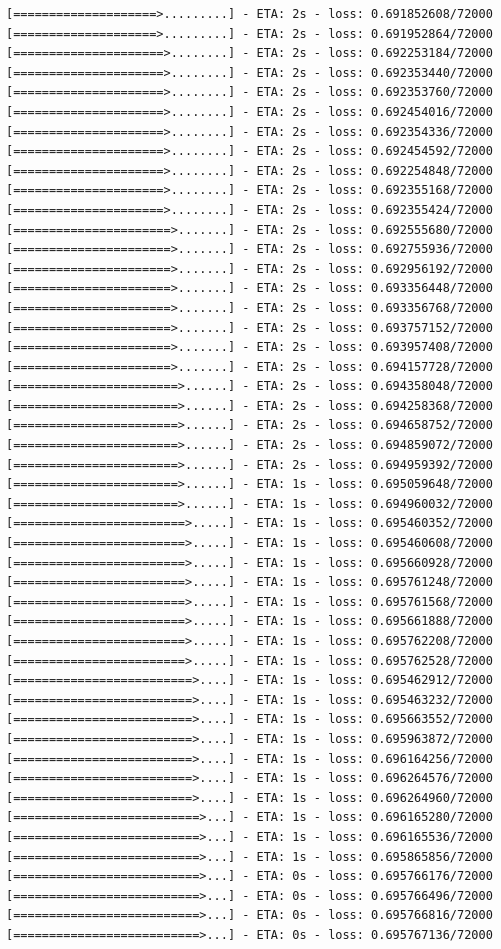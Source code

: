 \documentclass[12pt,fleqn]{article}\usepackage{../../common}
\begin{document}
\begin{verbatim}
[====================>.........] - ETA: 2s - loss: 0.691852608/72000 [====================>.........] - ETA: 2s - loss: 0.691952864/72000 [=====================>........] - ETA: 2s - loss: 0.692253184/72000 [=====================>........] - ETA: 2s - loss: 0.692353440/72000 [=====================>........] - ETA: 2s - loss: 0.692353760/72000 [=====================>........] - ETA: 2s - loss: 0.692454016/72000 [=====================>........] - ETA: 2s - loss: 0.692354336/72000 [=====================>........] - ETA: 2s - loss: 0.692454592/72000 [=====================>........] - ETA: 2s - loss: 0.692254848/72000 [=====================>........] - ETA: 2s - loss: 0.692355168/72000 [=====================>........] - ETA: 2s - loss: 0.692355424/72000 [======================>.......] - ETA: 2s - loss: 0.692555680/72000 [======================>.......] - ETA: 2s - loss: 0.692755936/72000 [======================>.......] - ETA: 2s - loss: 0.692956192/72000 [======================>.......] - ETA: 2s - loss: 0.693356448/72000 [======================>.......] - ETA: 2s - loss: 0.693356768/72000 [======================>.......] - ETA: 2s - loss: 0.693757152/72000 [======================>.......] - ETA: 2s - loss: 0.693957408/72000 [======================>.......] - ETA: 2s - loss: 0.694157728/72000 [=======================>......] - ETA: 2s - loss: 0.694358048/72000 [=======================>......] - ETA: 2s - loss: 0.694258368/72000 [=======================>......] - ETA: 2s - loss: 0.694658752/72000 [=======================>......] - ETA: 2s - loss: 0.694859072/72000 [=======================>......] - ETA: 2s - loss: 0.694959392/72000 [=======================>......] - ETA: 1s - loss: 0.695059648/72000 [=======================>......] - ETA: 1s - loss: 0.694960032/72000 [========================>.....] - ETA: 1s - loss: 0.695460352/72000 [========================>.....] - ETA: 1s - loss: 0.695460608/72000 [========================>.....] - ETA: 1s - loss: 0.695660928/72000 [========================>.....] - ETA: 1s - loss: 0.695761248/72000 [========================>.....] - ETA: 1s - loss: 0.695761568/72000 [========================>.....] - ETA: 1s - loss: 0.695661888/72000 [========================>.....] - ETA: 1s - loss: 0.695762208/72000 [========================>.....] - ETA: 1s - loss: 0.695762528/72000 [=========================>....] - ETA: 1s - loss: 0.695462912/72000 [=========================>....] - ETA: 1s - loss: 0.695463232/72000 [=========================>....] - ETA: 1s - loss: 0.695663552/72000 [=========================>....] - ETA: 1s - loss: 0.695963872/72000 [=========================>....] - ETA: 1s - loss: 0.696164256/72000 [=========================>....] - ETA: 1s - loss: 0.696264576/72000 [=========================>....] - ETA: 1s - loss: 0.696264960/72000 [==========================>...] - ETA: 1s - loss: 0.696165280/72000 [==========================>...] - ETA: 1s - loss: 0.696165536/72000 [==========================>...] - ETA: 1s - loss: 0.695865856/72000 [==========================>...] - ETA: 0s - loss: 0.695766176/72000 [==========================>...] - ETA: 0s - loss: 0.695766496/72000 [==========================>...] - ETA: 0s - loss: 0.695766816/72000 [==========================>...] - ETA: 0s - loss: 0.695767136/72000 
\end{verbatim}
\end{document}
